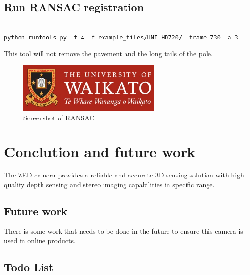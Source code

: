 \subsection{Run RANSAC registration}

\begin{lstlisting}

python runtools.py -t 4 -f example_files/UNI-HD720/ -frame 730 -a 3

\end{lstlisting}

 This tool will not remove the pavement and the long tails of the pole. 

\begin{figure}[htbp]
  \centerline{\includegraphics[width=200pt]{images/UoW.jpg}}
  \caption{Screenshot of RANSAC }
  \label{fig313}
\end{figure} 


\section{Conclution and future work}

The ZED camera provides a reliable and accurate 3D sensing solution with high-quality depth sensing and stereo imaging capabilities in specific range.

\subsection{Future work}

There is some work that needs to be done in the future to ensure this camera is used in online products.

\subsection{Todo List}

